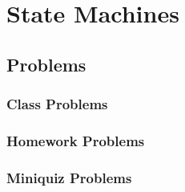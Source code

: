 \chapter{State Machines}
\coursecopyright


\section{Problems}
\subsection{Class Problems}
%
%
\clearpage

\subsection{Homework Problems}
\clearpage

\subsection{Miniquiz Problems}
\clearpage

\endinput